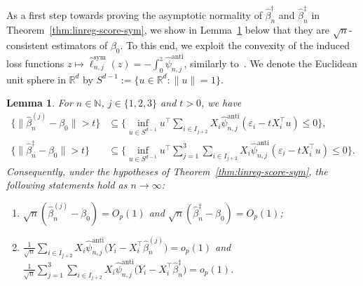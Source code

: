 \documentclass[a4paper]{article}
\newcommand{\N}{\mathbb{N}}
\newcommand{\R}{\mathbb{R}}
\newcommand{\norm}[1]{\|{#1}\|}
\newtheorem{lemma}[theorem]{Lemma}
\theoremstyle{definition}
\begin{document}
As a first step towards proving the asymptotic normality of $\hat{\beta}_n^\dagger$ and $\hat{\beta}_n^\ddagger$ in Theorem~\ref{thm:linreg-score-sym}, we show in Lemma~\ref{lem:linreg-sym-consistency} below that they are $\sqrt{n}$-consistent estimators of $\beta_0$. To this end, we exploit the convexity of the induced loss functions $z \mapsto \hat{\ell}_{n,j}^{\mathrm{sym}}(z) = -\int_0^z \hat{\psi}_{n,j}^{\mathrm{anti}}$, similarly to~\citet[Theorem~2.1]{he2000parameters}.  We denote the Euclidean unit sphere in $\mathbb{R}^d$ by $S^{d-1} := \{u \in \R^d : \|u\| = 1\}$.
\begin{lemma}
\label{lem:linreg-sym-consistency}
For $n \in \N$, $j \in \{1,2,3\}$ and $t > 0$, we have
\begin{align}
\label{eq:linreg-sym-sphere-j}
\bigl\{\norm{\hat{\beta}_n^{(j)} - \beta_0} > t\bigr\} &\subseteq \biggl\{\inf_{u \in S^{d-1}}u^\top \sum_{i \in I_{j+2}} X_i\hat{\psi}_{n,j}^{\mathrm{anti}}(\varepsilon_i - tX_i^\top u) \leq 0\biggr\}, \\
\label{eq:linreg-sym-sphere}
\bigl\{\norm{\hat{\beta}_n^\ddagger - \beta_0} > t\bigr\} &\subseteq \biggl\{\inf_{u \in S^{d-1}}u^\top \sum_{j=1}^3 \sum_{i \in I_{j+2}} X_i\hat{\psi}_{n,j}^{\mathrm{anti}}(\varepsilon_i - tX_i^\top u) \leq 0\biggr\}.
\end{align}
Consequently, under the hypotheses of Theorem~\ref{thm:linreg-score-sym}, the following statements hold as $n \to \infty$:
\begin{enumerate}[label=(\alph*)]
\item $\sqrt{n}(\hat{\beta}_n^{(j)} - \beta_0) = O_p(1)$ and $\sqrt{n}(\hat{\beta}_n^\ddagger - \beta_0) = O_p(1)$;
\item $\displaystyle\frac{1}{\sqrt{n}}\sum_{i \in I_{j+2}} X_i\hat{\psi}_{n,j}^{\mathrm{anti}}\bigl(Y_i - X_i^\top\hat{\beta}_n^{(j)}\bigr) = o_p(1)$ \; and \; $\displaystyle\frac{1}{\sqrt{n}}\sum_{j=1}^3 \sum_{i \in I_{j+2}} X_i\hat{\psi}_{n,j}^{\mathrm{anti}}\bigl(Y_i - X_i^\top\hat{\beta}_n^\ddagger\bigr) = o_p(1)$.
\end{enumerate}
\end{lemma}
\end{document}
